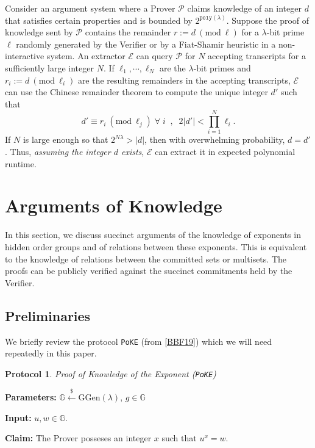 \documentclass[11pt, lettersize, notitlepage, leqno, footskip=0.6cm]{article}
\newcommand{\pl}{\prod\limits}
\newcommand{\ttt}{\texttt}
\newcommand{\mc}{\mathcal}
\newcommand{\mb}{\mathbb}
\newcommand{\mr}{\mathrm}
\newcommand{\lam}{\lambda}
\newcommand{\lamb}{\lambda}
\newcommand{\mP}{\mc{P}}
\newcommand{\vs}{\vspace{-0.15cm}}
\newcommand{\op}{overwhelming probability}
\newcommand{\Mod}[1]{\ (\mathrm{mod}\ #1)}
\newcommand{\E}{\mc{E}}
\newtheorem{Prot}[Thm]{Protocol}
\numberwithin{equation}{section}
\begin{document}
Consider an argument system where a Prover $\mP$ claims knowledge of an integer $d$ that satisfies certain properties and is bounded by $2^{\ttt{poly}(\lam)}$. Suppose the proof of knowledge sent by $\mP$ contains the remainder $r:= d\Mod{\ell}$ for a $\lam$-bit prime $\ell$ randomly generated by the Verifier or by a Fiat-Shamir heuristic in a non-interactive system. An extractor $\E$ can query $\mP$ for $N$ accepting transcripts for a sufficiently large integer $N$. If $\ell_1,\cdots,\ell_N$ are the $\lam$-bit primes and $r_i:= d\Mod{\ell_i}$ are the resulting remainders in the accepting transcripts, $\E$ can use the Chinese remainder theorem to compute the unique integer $d'$ such that \vs $$d'\equiv r_i\Mod{\ell_j}\;\forall\;i\;\;,\;\; 2|d'| < \pl_{i=1}^N \ell_i.$$ If $N$ is large enough so that $2^{N\lam} > |d|$, then with \op, $d = d'$. Thus, \textit{assuming the integer $d$ exists}, $\E$ can extract it in expected polynomial runtime.



\section{\fontsize{12}{12}\selectfont Arguments of Knowledge  }

In this section, we discuss succinct arguments of the knowledge of exponents in hidden order groups and of relations between these exponents. This is equivalent to the knowledge of relations between the committed sets or multisets. The proofs can be publicly verified against the succinct commitments held by the Verifier.

\subsection{\fontsize{11}{11}\selectfont Preliminaries}

\noindent We briefly review the protocol \verb|PoKE| (from \hyperlink{BBF19}{[BBF19]}) which we will need repeatedly in this paper.

\begin{Prot} \normalfont \textit{Proof of Knowledge of the Exponent} (\verb|PoKE|) \end{Prot} \vspace{-0.3cm}

\noindent \textbf{Parameters:} $\mb{G}\xleftarrow{\$} \mr{GGen}(\lamb)$,\; $g\in \mb{G}$

\noindent \textbf{Input:} $u, w \in \mb{G}$.

\noindent \textbf{Claim:} The Prover posseses an integer $x$ such that $u^x = w$. 
\end{document}
